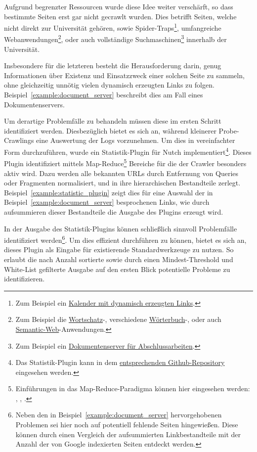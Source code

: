 Aufgrund begrenzter Ressourcen wurde diese Idee weiter verschärft,
so dass bestimmte Seiten erst gar nicht gecrawlt wurden.
Dies betrifft Seiten, welche nicht direkt zur Universität gehören,
sowie Spider-Traps\footnote{Zum Beispiel ein
\href{http://www.informatik.uni-leipzig.de/~meyer/?d=15}{Kalender mit dynamisch erzeugten Links}.},
umfangreiche Webanwendungen\footnote{Zum Beispiel die 
\href{http://wortschatz.uni-leipzig.de/de}{Wortschatz}-, verschiedene 
\href{http://www.informatik.uni-leipzig.de/~duc/TD/td/index.php?bpos=72&db=ev}{Wörterbuch}-, oder auch
\href{http://pcai003.informatik.uni-leipzig.de/kosemnet/}{Semantic-Web}-Anwendungen.},
oder auch vollständige Suchmaschinen\footnote{Zum Beispiel ein
\href{http://lips.informatik.uni-leipzig.de/}{Dokumentenserver für Abschlussarbeiten}.} innerhalb der Universität.

Insbesondere für die letzteren besteht die Herausforderung darin,
genug Informationen über Existenz und Einsatzzweck einer solchen Seite zu sammeln,
ohne gleichzeitig unnötig vielen dynamisch erzeugten Links zu folgen.
Beispiel~\ref{example:document_server} beschreibt dies am Fall eines Dokumentenservers.



Um derartige Problemfälle zu behandeln müssen diese im ersten Schritt identifiziert werden.
Diesbezüglich bietet es sich an, während kleinerer Probe-Crawlings eine Auswertung der Logs vorzunehmen.
Um dies in vereinfachter Form durchzuführen,
wurde ein Statistik-Plugin für Nutch implementiert\footnote{Das Statistik-Plugin kann in dem
\href{https://github.com/DaniloMorgado/url_statistic_plugin}{entsprechenden Github-Repository} eingesehen werden.}.
Dieses Plugin identifiziert mittels
Map-Reduce\footnote{Einführungen in das Map-Reduce-Paradigma können hier eingesehen werden: \cite{wiki.mapreduce},
\cite{nosql.mapreduce}, \cite{hadoop.mapreduce}.}
Bereiche für die der Crawler besonders aktiv wird.
Dazu werden alle bekannten URLs durch Entfernung
von Queries oder Fragmenten normalisiert, und in ihre hierarchischen Bestandteile zerlegt.
Beispiel~\ref{example:statistic_plugin} zeigt dies für eine Auswahl der in
Beispiel~\ref{example:document_server} besprochenen Links,
wie durch aufsummieren dieser Bestandteile die Ausgabe des Plugins erzeugt wird.



In der Ausgabe des Statistik-Plugins können schließlich sinnvoll Problemfälle identifiziert
werden\footnote{Neben den in Beispiel~\ref{example:document_server} hervorgehobenen Problemen sei hier noch auf potentiell fehlende Seiten hingewießen.
Diese können durch einen Vergleich der aufsummierten Linkbestandteile mit der Anzahl der von Google indexierten Seiten entdeckt werden.}.
Um dies effizient durchführen zu können,
bietet es sich an, dieses Plugin als Eingabe für existierende Standardwerkzeuge zu nutzen.
So erlaubt die nach Anzahl sortierte sowie durch einen Mindest-Threshold und White-List gefilterte Ausgabe
auf den ersten Blick potentielle Probleme zu identifizieren.

